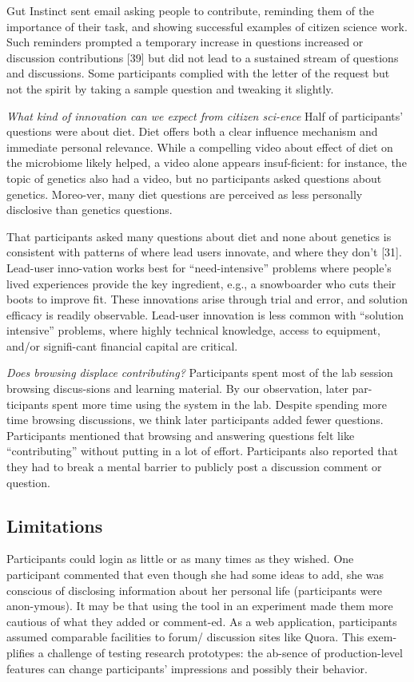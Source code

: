 Gut Instinct sent email asking people to contribute, reminding them of the importance of their task, and showing successful examples of citizen science work. Such reminders 
prompted a temporary increase in questions increased or discussion contributions [39] but did not lead to a sustained stream of questions and discussions. Some participants complied with the letter of the request but not the spirit by taking a sample question and tweaking it slightly.

\textit{What kind of innovation can we expect from citizen sci-ence}
Half of participants’ questions were about diet. Diet offers both a clear influence mechanism and immediate personal relevance. While a compelling video about effect of diet on the microbiome likely helped, a video alone appears insuf-ficient: for instance, the topic of genetics also had a video, but no participants asked questions about genetics. Moreo-ver, many diet questions are perceived as less personally disclosive than genetics questions.
 
That participants asked many questions about diet and none about genetics is consistent with patterns of where lead users innovate, and where they don’t [31]. Lead-user inno-vation works best for “need-intensive” problems where people’s lived experiences provide the key ingredient, e.g., a snowboarder who cuts their boots to improve fit. These innovations arise through trial and error, and solution efficacy is readily observable. Lead-user innovation is less common with “solution intensive” problems, where highly technical knowledge, access to equipment, and/or signifi-cant financial capital are critical. 
 
\textit{Does browsing displace contributing?}
Participants spent most of the lab session browsing discus-sions and learning material. By our observation, later par-ticipants spent more time using the system in the lab. Despite spending more time browsing discussions, we think later participants added fewer questions. Participants mentioned that browsing and answering questions felt like “contributing” without putting in a lot of effort. Participants also reported that they had to break a mental barrier to publicly post a discussion comment or question. 

\subsection{Limitations}
Participants could login as little or as many times as they wished. One participant commented that even though she had some ideas to add, she was conscious of disclosing information about her personal life (participants were anon-ymous). It may be that using the tool in an experiment made them more cautious of what they added or comment-ed.
As a web application, participants assumed comparable facilities to forum/ discussion sites like Quora. This exem-plifies a challenge of testing research prototypes: the ab-sence of production-level features can change participants’ impressions and possibly their behavior.


